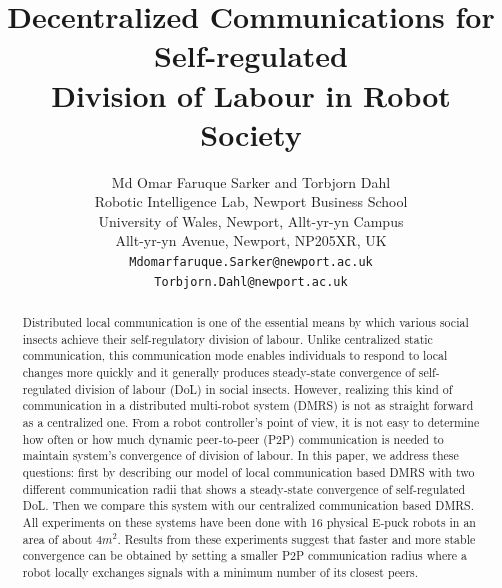\documentclass[a4paper, 10pt, conference]{ieeeconf}      %
\title{\LARGE \bf
Decentralized Communications for Self-regulated\\ Division of Labour in Robot Society
}
\author{ Md Omar Faruque Sarker and Torbjorn Dahl\\
        Robotic Intelligence Lab, Newport Business School\\
		University of Wales, Newport, Allt-yr-yn Campus\\ 
		Allt-yr-yn Avenue, Newport, NP205XR, UK\\
		{\tt\small Mdomarfaruque.Sarker@newport.ac.uk}\\ 
		{\tt\small Torbjorn.Dahl@newport.ac.uk}      
}
\begin{document}
\maketitle
\thispagestyle{empty}
\pagestyle{empty}


\begin{abstract}

Distributed local communication is one of the essential means by which various social insects achieve their self-regulatory division of labour. Unlike centralized static communication, this communication mode enables individuals to respond to local changes more quickly and it generally produces steady-state convergence of self-regulated division of labour (DoL) in social insects. However, realizing this kind of communication in a distributed multi-robot system (DMRS) is not as straight forward as a centralized one. From a robot controller's point of view, it is not easy to determine how often or how much dynamic peer-to-peer (P2P) communication  is needed to maintain system's convergence of division of labour. In this paper, we address these questions: first by describing our model of local communication based DMRS with two different communication radii that shows a steady-state convergence of self-regulated DoL. Then we compare this system with our centralized communication based DMRS. All experiments on these systems  have been done with 16 physical E-puck robots in an area of about 4$m^2$. Results from these experiments suggest that faster and more stable convergence can be obtained by setting a smaller P2P communication radius where a robot locally exchanges signals with a minimum number of its closest peers.

\end{abstract}


\end{document}
